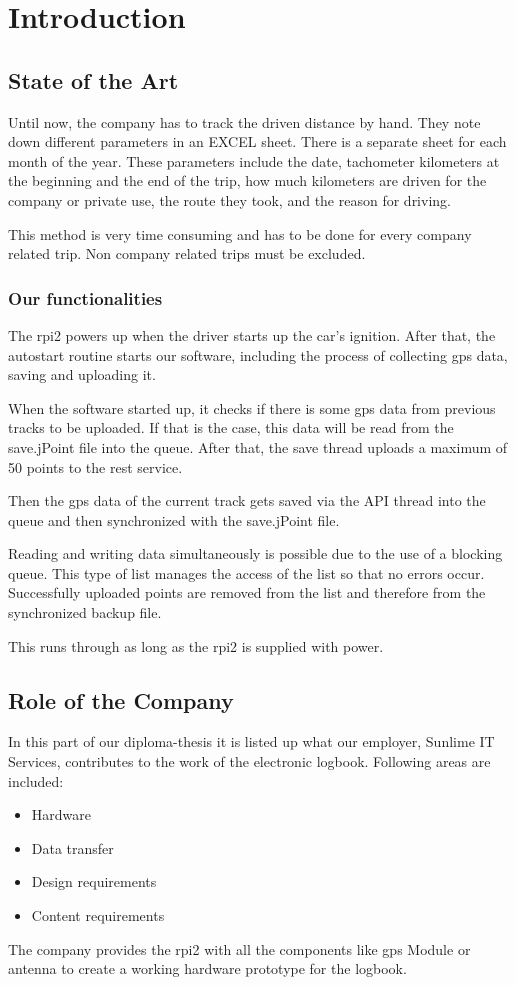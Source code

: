 \chapter*{Introduction}
\section*{State of the Art}
Until now, the company has to track the driven distance by hand. They note down different parameters in an EXCEL sheet. There is a separate sheet for each month of the year. These parameters include the date, tachometer kilometers at the beginning and the end of the trip, how much kilometers are driven for the company or private use, the route they took, and the reason for driving.

This method is very time consuming and has to be done for every company related trip. Non company related trips must be excluded.
\subsection*{Our functionalities}
The \gls{rpi2} powers up when the driver starts up the car's ignition. After that, the autostart routine starts our software, including the process of collecting \gls{gps} data, saving and uploading it.

When the software started up, it checks if there is some \gls{gps} data from previous tracks to be uploaded. If that is the case, this data will be read from the save.jPoint file into the queue. After that, the save thread uploads a maximum of 50 points to the \gls{rest} service. 


Then the \gls{gps} data of the current track gets saved via the API thread into the queue and then synchronized with the save.jPoint file.

Reading and writing data simultaneously is possible due to the use of a blocking queue. This type of list manages the access of the list so that no errors occur.\newline
Successfully uploaded points are removed from the list and therefore from the synchronized backup file.

This runs through as long as the \gls{rpi2} is supplied with power.


\newpage
\section*{Role of the Company}
In this part of our diploma-thesis it is listed up what our employer, Sunlime IT Services, contributes to the work of the electronic logbook. Following areas are included:
\begin{itemize}
\item Hardware
\item Data transfer
\item Design requirements
\item Content requirements
\end{itemize}
The company provides the \gls{rpi2} with all the components like \gls{gps} Module or antenna to create a working hardware prototype for the logbook.

